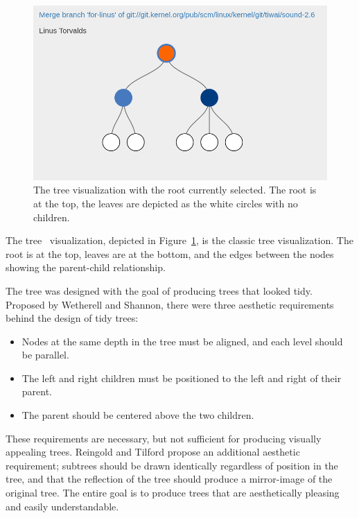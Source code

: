 \begin{figure}[htpb]
  \centering
  \includegraphics[width=0.9\linewidth]{Figures/Linvis/linvis_reingold_tree.png}
  \caption{The \rt{} tree visualization with the root currently
    selected. The root is at the top, the leaves are depicted as the
    white circles with no children.}
  \label{fig:linvis_reingold_tree}
\end{figure}

The \rt{} tree~\cite{Reingold1981} visualization, depicted in
Figure~\ref{fig:linvis_reingold_tree}, is the classic tree
visualization. The root is at the top, leaves are at the bottom, and the
edges between the nodes showing the parent-child relationship.

The \rt{} tree was designed with the goal of producing trees that looked
tidy. Proposed by Wetherell and Shannon\cite{Wetherell1979}, there were
three aesthetic requirements behind the design of tidy trees:

\begin{itemize}
  \item

    Nodes at the same depth in the tree must be aligned, and each level
    should be parallel.

  \item

    The left and right children must be positioned to the left and right
    of their parent.

  \item

    The parent should be centered above the two children.

\end{itemize}

These requirements are necessary, but not sufficient for producing
visually appealing trees. Reingold and Tilford propose an additional
aesthetic requirement; subtrees should be drawn identically regardless
of position in the tree, and that the reflection of the tree should
produce a mirror-image of the original tree. The entire goal is to
produce trees that are aesthetically pleasing and easily understandable.

